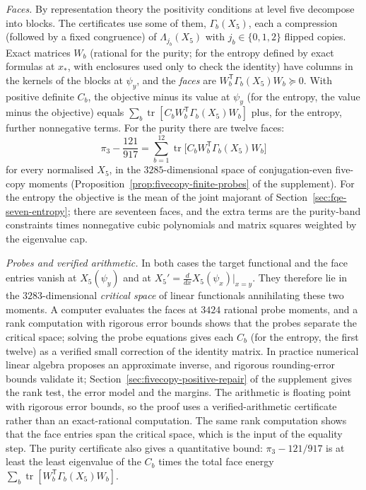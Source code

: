 \emph{Faces.} By representation theory the positivity conditions at level five decompose into blocks. The
certificates use some of them, $\Gamma_b(X_5)$, each a compression (followed by a fixed congruence) of $\Lambda_{j_b}(X_5)$
with $j_b\in\{0,1,2\}$ flipped copies. Exact matrices $W_b$ (rational for the purity; for the entropy defined by exact
formulas at $x_*$, with enclosures used only to check the identity) have columns in the kernels of the blocks at $\psi_y$,
and the \emph{faces} are $W_b^{\mathsf T}\Gamma_b(X_5)W_b\succeq0$. With positive definite $C_b$, the objective minus its value at
$\psi_y$ (for the entropy, the value minus the objective) equals $\sum_b\operatorname{tr}[C_bW_b^{\mathsf T}\Gamma_b(X_5)W_b]$
plus, for the entropy, further nonnegative terms. For the purity there are twelve faces:
\[
 \pi_3-\frac{121}{917}=\sum_{b=1}^{12}\operatorname{tr}\bigl[C_bW_b^{\mathsf T}\Gamma_b(X_5)W_b\bigr]
\]
for every normalised $X_5$, in the $3285$-dimensional space of conjugation-even five-copy moments
(Proposition~\ref{prop:fivecopy-finite-probes} of the supplement). For the entropy the objective is the
mean of the joint majorant of Section~\ref{sec:fqe-seven-entropy}; there are seventeen faces, and the extra terms are the
purity-band constraints times nonnegative cubic polynomials and matrix squares weighted by the eigenvalue cap.

\emph{Probes and verified arithmetic.} In both cases the target functional and the face entries vanish at $X_5(\psi_y)$ and at
$X_5'=\tfrac{d}{dx}X_5(\psi_x)|_{x=y}$. They therefore lie in the $3283$-dimensional \emph{critical space}
of linear functionals annihilating these two moments. A computer evaluates the faces at $3424$ rational probe
moments, and a rank computation with rigorous error bounds shows that the probes separate the critical space; solving
the probe equations gives each $C_b$ (for the entropy, the first twelve) as a verified small correction of the identity
matrix. In practice numerical linear algebra proposes an approximate inverse, and rigorous rounding-error bounds validate
it; Section~\ref{sec:fivecopy-positive-repair} of the supplement gives the rank test, the error model and the margins. The arithmetic is floating point with rigorous error bounds, so the proof uses a verified-arithmetic certificate
rather than an exact-rational computation. The same rank computation shows that the face entries span the critical space, which
is the input of the equality step. The purity certificate also gives a quantitative bound: $\pi_3-121/917$ is at least the
least eigenvalue of the $C_b$ times the total face energy $\sum_b\operatorname{tr}[W_b^{\mathsf T}\Gamma_b(X_5)W_b]$.

